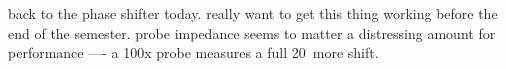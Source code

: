 back to the phase shifter today. really want to get this thing working before
the end of the semester. probe impedance seems to matter a distressing amount
for performance —- a 100x probe measures a full 20\textdegree\ more shift.

